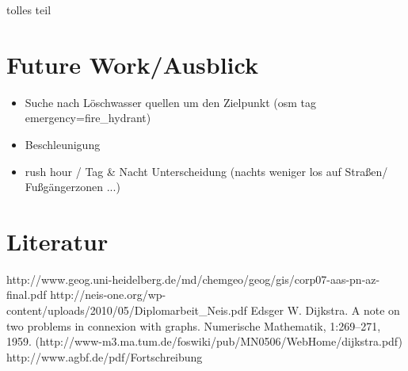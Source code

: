 \documentclass[10pt,a4paper]{article}
\begin{document}
tolles teil

\section{Future Work/Ausblick}
\begin{itemize}
\item Suche nach Löschwasser quellen um den Zielpunkt (osm tag emergency=fire_hydrant)
\item Beschleunigung
\item rush hour / Tag & Nacht Unterscheidung (nachts weniger los auf Straßen/ Fußgängerzonen ...)
\end{itemize}


\section{Literatur}

http://www.geog.uni-heidelberg.de/md/chemgeo/geog/gis/corp07-aas-pn-az-final.pdf
http://neis-one.org/wp-content/uploads/2010/05/Diplomarbeit_Neis.pdf
Edsger W. Dijkstra. A note on two problems in connexion with graphs. Numerische Mathematik,
1:269–271, 1959. (http://www-m3.ma.tum.de/foswiki/pub/MN0506/WebHome/dijkstra.pdf)
http://www.agbf.de/pdf/Fortschreibung%
\end{document}
